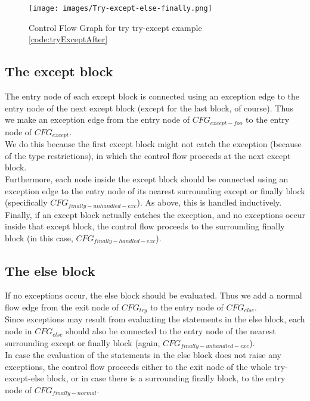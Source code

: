 \begin{figure}[p]
	\centering
	\texttt{[image: images/Try-except-else-finally.png]}
	\caption{Control Flow Graph for try try-except example \ref{code:tryExceptAfter}}
	\label{fig:callCfg}
\end{figure}

\subsection{The except block}
The entry node of each except block is connected using an exception edge to the entry node of the next except block (except for the last block, of course). Thus we make an exception edge from the entry node of $CFG_{except-foo}$ to the entry node of $CFG_{except}$. \\
We do this because the first except block might not catch the exception (because of the type restrictions), in which the control flow proceeds at the next except block. \\
Furthermore, each node inside the except block should be connected using an exception edge to the entry node of its nearest surrounding except or finally block (specifically $CFG_{finally-unhandled-exc}$). As above, this is handled inductively. \\
Finally, if an except block actually catches the exception, and no exceptions occur inside that except block, the control flow proceeds to the surrounding finally block (in this case, $CFG_{finally-handled-exc}$). 

\subsection{The else block}
If no exceptions occur, the else block should be evaluated. Thus we add a normal flow edge from the exit node of $CFG_{try}$ to the entry node of $CFG_{else}$.\\
Since exceptions may result from evaluating the statements in the else block, each node in $CFG_{else}$ should also be connected to the entry node of the nearest surrounding except or finally block (again, $CFG_{finally-unhandled-exc}$). \\
In case the evaluation of the statements in the else block does not raise any exceptions, the control flow proceeds either to the exit node of the whole try-except-else block, or in case there is a surrounding finally block, to the entry node of $CFG_{finally-normal}$.